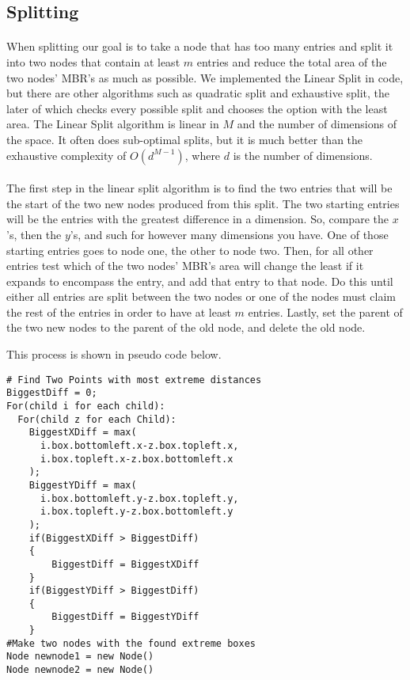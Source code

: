 \documentclass{article}
\begin{document}
\begin{multicols}{2}[]
\section{Splitting} 

\paragraph{}
When splitting our goal is to take a node that has too many entries and split it into
two nodes that contain at least $m$ entries and reduce the total area of the two nodes'
MBR's as much as possible. We implemented the Linear Split in code, but there are other
algorithms such as quadratic split and exhaustive split, the later of which checks every
possible split and chooses the option with the least area. The Linear Split algorithm
is linear in $M$ and the number of dimensions of the space. It often does sub-optimal
splits, but it is much better than the exhaustive complexity of $O(d^{M-1})$, where
$d$ is the number of dimensions.

\paragraph{}
The first step in the linear split algorithm is to find the two entries that will be the
start of the two new nodes produced from this split. The two starting entries will be the
entries with the greatest difference in a dimension. So, compare the $x$'s, then the $y$'s,
and such for however many dimensions you have. One of those starting entries goes to node one,
the other to node two. Then, for all other entries test which of the two nodes' MBR's area
will change the least if it expands to encompass the entry, and add that entry to that node. Do this
until either all entries are split between the two nodes or one of the nodes must claim the
rest of the entries in order to have at least $m$ entries. Lastly, set the parent of the two
new nodes to the parent of the old node, and delete the old node.

This process is shown in pseudo code below.

\begin{lstlisting}
# Find Two Points with most extreme distances
BiggestDiff = 0;
For(child i for each child):
  For(child z for each Child):
    BiggestXDiff = max(
      i.box.bottomleft.x-z.box.topleft.x,
      i.box.topleft.x-z.box.bottomleft.x
    );
    BiggestYDiff = max(
      i.box.bottomleft.y-z.box.topleft.y,
      i.box.topleft.y-z.box.bottomleft.y
    );
    if(BiggestXDiff > BiggestDiff)
    {
        BiggestDiff = BiggestXDiff
    }
    if(BiggestYDiff > BiggestDiff)
    {
        BiggestDiff = BiggestYDiff
    }
#Make two nodes with the found extreme boxes
Node newnode1 = new Node()
Node newnode2 = new Node()


\end{lstlisting}
\end{multicols}
\end{document}
